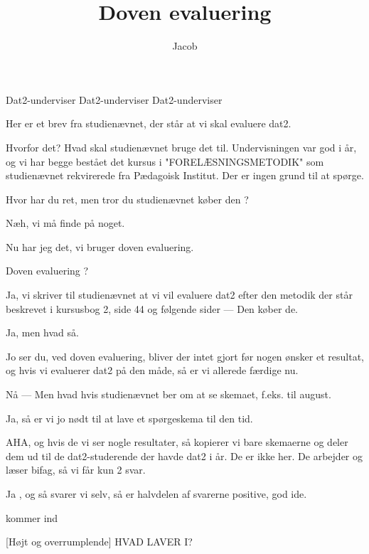 \documentclass[a4paper,11pt]{article}
\title{Doven evaluering}
\author{Jacob}
\begin{document}
\maketitle
\begin{roles}

 Dat2-underviser
 Dat2-underviser
 Dat2-underviser
\end{roles}

\begin{sketch}

 Her er et brev fra studienævnet, der står at vi skal
evaluere dat2.

 Hvorfor det? Hvad skal studienævnet bruge det til.
Undervisningen  var god i år, og vi har begge bestået det kursus i
"FORELÆSNINGSMETODIK" som studienævnet rekvirerede fra Pædagoisk
Institut. Der er ingen grund  til at spørge.

 Hvor har du ret, men tror du studienævnet køber den ?

 Næh, vi må finde på noget.

 Nu har jeg det, vi bruger doven evaluering.

 Doven evaluering ?

 Ja, vi skriver til studienævnet at vi vil evaluere
dat2 efter den metodik der står beskrevet i kursusbog 2, side 44 og
følgende sider --- Den  køber de.

 Ja, men hvad så.

 Jo ser du, ved doven evaluering, bliver der intet
gjort før nogen ønsker  et resultat, og hvis vi evaluerer dat2 på den måde, så er vi allerede  færdige nu.

 Nå  --- Men hvad hvis studienævnet ber om at se skemaet, f.eks. til  august.

 Ja, så er vi jo nødt til at lave et spørgeskema til den tid.

 AHA, og hvis de vi ser nogle resultater, så kopierer
vi bare skemaerne og deler dem ud til de dat2-studerende der havde dat2 i år. De er ikke her. De arbejder og læser bifag, så vi får kun 2 svar.

 Ja , og så svarer vi selv, så er halvdelen af svarerne
positive, god ide. 

 kommer ind

[Højt og overrumplende] HVAD LAVER I?


\end{sketch}
\end{document}
